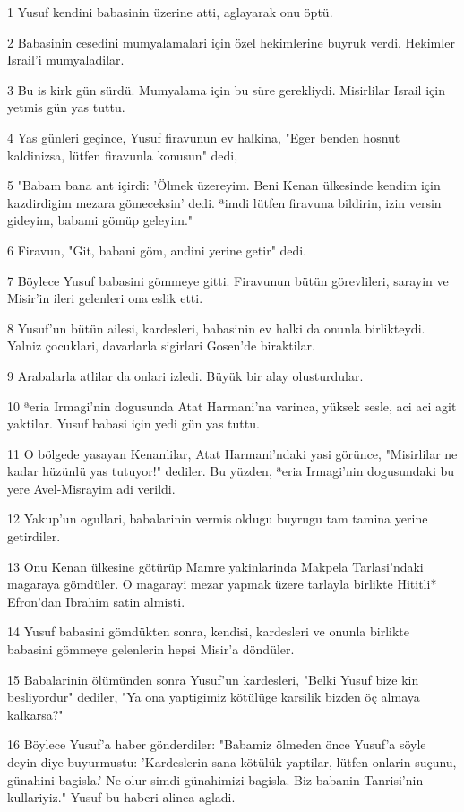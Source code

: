 \par 1 Yusuf kendini babasinin üzerine atti, aglayarak onu öptü.
\par 2 Babasinin cesedini mumyalamalari için özel hekimlerine buyruk verdi. Hekimler Israil'i mumyaladilar.
\par 3 Bu is kirk gün sürdü. Mumyalama için bu süre gerekliydi. Misirlilar Israil için yetmis gün yas tuttu.
\par 4 Yas günleri geçince, Yusuf firavunun ev halkina, "Eger benden hosnut kaldinizsa, lütfen firavunla konusun" dedi,
\par 5 "Babam bana ant içirdi: 'Ölmek üzereyim. Beni Kenan ülkesinde kendim için kazdirdigim mezara gömeceksin' dedi. ªimdi lütfen firavuna bildirin, izin versin gideyim, babami gömüp geleyim."
\par 6 Firavun, "Git, babani göm, andini yerine getir" dedi.
\par 7 Böylece Yusuf babasini gömmeye gitti. Firavunun bütün görevlileri, sarayin ve Misir'in ileri gelenleri ona eslik etti.
\par 8 Yusuf'un bütün ailesi, kardesleri, babasinin ev halki da onunla birlikteydi. Yalniz çocuklari, davarlarla sigirlari Gosen'de biraktilar.
\par 9 Arabalarla atlilar da onlari izledi. Büyük bir alay olusturdular.
\par 10 ªeria Irmagi'nin dogusunda Atat Harmani'na varinca, yüksek sesle, aci aci agit yaktilar. Yusuf babasi için yedi gün yas tuttu.
\par 11 O bölgede yasayan Kenanlilar, Atat Harmani'ndaki yasi görünce, "Misirlilar ne kadar hüzünlü yas tutuyor!" dediler. Bu yüzden, ªeria Irmagi'nin dogusundaki bu yere Avel-Misrayim adi verildi.
\par 12 Yakup'un ogullari, babalarinin vermis oldugu buyrugu tam tamina yerine getirdiler.
\par 13 Onu Kenan ülkesine götürüp Mamre yakinlarinda Makpela Tarlasi'ndaki magaraya gömdüler. O magarayi mezar yapmak üzere tarlayla birlikte Hititli* Efron'dan Ibrahim satin almisti.
\par 14 Yusuf babasini gömdükten sonra, kendisi, kardesleri ve onunla birlikte babasini gömmeye gelenlerin hepsi Misir'a döndüler.
\par 15 Babalarinin ölümünden sonra Yusuf'un kardesleri, "Belki Yusuf bize kin besliyordur" dediler, "Ya ona yaptigimiz kötülüge karsilik bizden öç almaya kalkarsa?"
\par 16 Böylece Yusuf'a haber gönderdiler: "Babamiz ölmeden önce Yusuf'a söyle deyin diye buyurmustu: 'Kardeslerin sana kötülük yaptilar, lütfen onlarin suçunu, günahini bagisla.' Ne olur simdi günahimizi bagisla. Biz babanin Tanrisi'nin kullariyiz." Yusuf bu haberi alinca agladi.

